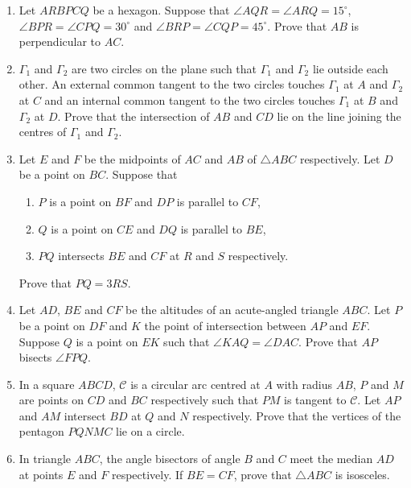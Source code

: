 \documentclass[12pt]{article}
\begin{document}
\begin{enumerate}[resume]


    \item Let $ARBPCQ$ be a hexagon. Suppose that $\angle AQR=\angle ARQ=15^{\circ}$, $\angle BPR=\angle CPQ=30^{\circ}$ and $\angle BRP=\angle CQP=45^{\circ}$. Prove that $AB$ is perpendicular to $AC$.

    \item $\Gamma_{1}$ and $\Gamma_{2}$ are two circles on the plane such that $\Gamma_{1}$ and $\Gamma_{2}$ lie outside each other. An external common tangent to the two circles touches $\Gamma_{1}$ at $A$ and $\Gamma_{2}$ at $C$ and an internal common tangent to the two circles touches $\Gamma_{1}$ at $B$ and $\Gamma_{2}$ at $D$. Prove that the intersection of $AB$ and $CD$ lie on the line joining the centres of $\Gamma_{1}$ and $\Gamma_{2}$.

    \item Let $E$ and $F$ be the midpoints of $AC$ and $AB$ of $\triangle ABC$ respectively. Let $D$ be a point on $BC$. Suppose that
    \begin{enumerate}
        \item[(i)] $P$ is a point on $BF$ and $DP$ is parallel to $CF$,
        \item[(ii)] $Q$ is a point on $CE$ and $DQ$ is parallel to $BE$,
        \item[(iii)] $PQ$ intersects $BE$ and $CF$ at $R$ and $S$ respectively.
    \end{enumerate}
    Prove that $PQ=3RS.$

    \item Let $AD$, $BE$ and $CF$ be the altitudes of an acute-angled triangle $ABC$. Let $P$ be a point on $DF$ and $K$ the point of intersection between $AP$ and $EF$. Suppose $Q$ is a point on $EK$ such that $\angle KAQ=\angle DAC$. Prove that $AP$ bisects $\angle FPQ$.

    \item In a square $ABCD$, $\mathcal{C}$ is a circular arc centred at $A$ with radius $AB$, $P$ and $M$ are points on $CD$ and $BC$ respectively such that $PM$ is tangent to $\mathcal{C}$. Let $AP$ and $AM$ intersect $BD$ at $Q$ and $N$ respectively. Prove that the vertices of the pentagon $PQNMC$ lie on a circle.

    \item In triangle $ABC$, the angle bisectors of angle $B$ and $C$ meet the median $AD$ at points $E$ and $F$ respectively. If $BE=CF$, prove that $\triangle ABC$ is isosceles.


\end{enumerate}
\end{document}
